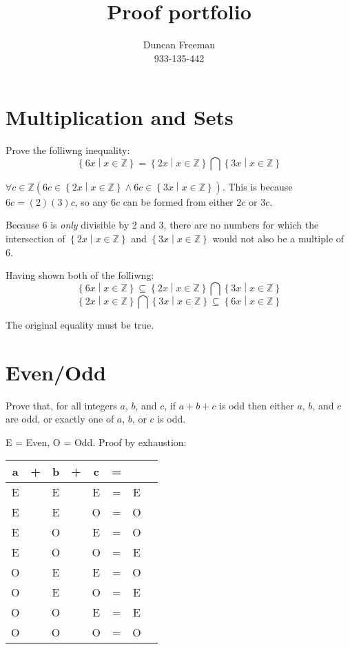 \documentclass{article}
\title{ Proof portfolio }
\begin{document}
\author{
    Duncan Freeman \\ 933-135-442
}

\maketitle

\section{Multiplication and Sets}
\newcommand{\mulset}[1]{ \left\{ #1 \middle| x \in \mathbb{Z} \right\} }

Prove the folliwng inequality:
\[ \mulset{6x} = \mulset{2x} \bigcap \mulset{3x} \]

$\forall c \in \mathbb{Z} \left( 6c \in \mulset{2x} \land 6c \in \mulset{3x}\right)$. This is because $6c = (2)(3)c$, so any $6c$ can be formed from either $2c$ or $3c$.

\bigskip

Because 6 is \textit{only} divisible by 2 and 3, there are no numbers for which the intersection of $\mulset{2x}$ and $\mulset{3x}$ would not also be a multiple of 6.

\smallskip

Having shown both of the folliwng:
\[ \mulset{6x} \subseteq \mulset{2x} \bigcap \mulset{3x} \]
\[  \mulset{2x} \bigcap \mulset{3x} \subseteq \mulset{6x}  \]

The original equality must be true.

\section{Even/Odd}
Prove that, for all integers $a$, $b$, and $c$, if $a + b + c$ is odd then either $a$, $b$, and $c$ are odd, or exactly one of $a$, $b$, or $c$ is odd.

\bigskip

E = Even, O = Odd. Proof by exhaustion:

\begin{center}
    \begin{tabular}{ c c c c c c c c }
        a & + & b & + & c & = && \\
        \hline
        E && E && E & = & E \\
        E && E && O & = & O \\
        E && O && E & = & O \\
        E && O && O & = & E \\
        O && E && E & = & O \\
        O && E && O & = & E \\
        O && O && E & = & E \\
        O && O && O & = & O \\
    \end{tabular}
\end{center}
\end{document}
